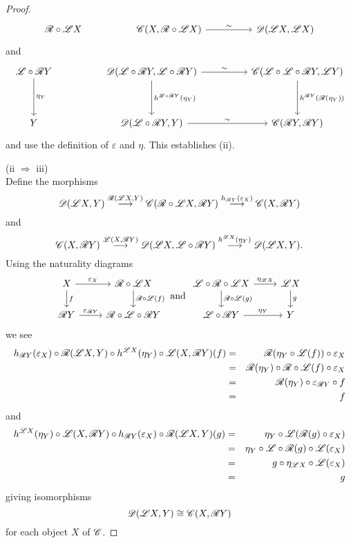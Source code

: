 \documentclass[10pt]{amsart}
\begin{document}
\begin{prop}
\begin{proof}
$$\begin{tikzcd}
      \RA \circ \LA X & & \C(X, \RA \circ \LA X) \arrow{rr}{\sim} & & \D(\LA X, \LA X)
    \end{tikzcd}$$
    and
    $$\begin{tikzcd}
      \LA \circ \RA Y \arrow{dd}{\eta_Y} & & \D(\LA \circ \RA Y, \LA \circ \RA Y) \arrow{rr}{\sim}\arrow{dd}{h^{\LA \circ \RA Y}(\eta_Y)} & & \C(\LA \circ \LA \circ \RA Y, \LA Y) \arrow{dd}{h^{\RA Y}(\RA(\eta_Y))}\\
      \\
      Y & & \D(\LA \circ \RA Y, Y) \arrow{rr}{\sim}  & & \C(\RA Y, \RA Y)
    \end{tikzcd}$$
    and use the definition of $\varepsilon$ and $\eta$.
    This establishes (ii).
    
    (ii $\Rightarrow$ iii)\\
    Define the morphisms
    $$\mathscr{D}(\mathscr{L} X, Y) \overset{\mathscr{R}(\mathscr{L} X, Y)}\longrightarrow \mathscr{C}(\mathscr{R} \circ \mathscr{L} X, \mathscr{R} Y) \overset{h_{\mathscr{R} Y}(\varepsilon_X)}\longrightarrow \mathscr{C}(X, \mathscr{R} Y)$$
    and
    $$\mathscr{C}(X, \mathscr{R} Y) \overset{\mathscr{L}(X, \mathscr{R} Y)}\longrightarrow \mathscr{D}(\mathscr{L} X, \mathscr{L} \circ \mathscr{R} Y) \overset{h^{\mathscr{L} X}(\eta_Y)}\longrightarrow \mathscr{D}(\mathscr{L} X, Y).$$
    Using the naturality diagrams
    $$\begin{tikzcd}
      X \arrow{r}{\varepsilon_X}\arrow{d}{f} & \RA \circ \LA X \arrow{d}{\RA \circ \LA(f)}\\
      \RA Y \arrow{r}{\varepsilon_{\RA Y}} & \RA \circ \LA \circ \RA Y
    \end{tikzcd}
    \ \text{and}\ 
    \begin{tikzcd}
      \LA \circ \RA \circ \LA X \arrow{r}{\eta_{\LA X}}\arrow{d}{\RA \circ \LA(g)} & \LA X \arrow{d}{g}\\
      \LA \circ \RA Y \arrow{r}{\eta_Y} & Y
    \end{tikzcd}$$
    we see
    \begin{eqnarray*}
      h_{\mathscr{R} Y}(\varepsilon_X) \circ \mathscr{R}(\mathscr{L} X, Y) \circ h^{\mathscr{L} X}(\eta_Y) \circ \mathscr{L}(X, \mathscr{R} Y)(f) &=& \mathscr{R}(\eta_Y \circ \mathscr{L}(f)) \circ \varepsilon_X\\
      &=& \mathscr{R}(\eta_Y) \circ \mathscr{R} \circ \mathscr{L}(f) \circ \varepsilon_X\\
      &=& \mathscr{R}(\eta_Y) \circ \varepsilon_{\mathscr{R} Y} \circ f\\
      &=& f
    \end{eqnarray*}
    and
    \begin{eqnarray*}
      h^{\mathscr{L} X}(\eta_Y) \circ \mathscr{L}(X, \mathscr{R} Y) \circ h_{\mathscr{R} Y}(\varepsilon_X) \circ \mathscr{R}(\mathscr{L} X, Y)(g) &=& \eta_Y \circ \mathscr{L}(\mathscr{R}(g) \circ \varepsilon_X)\\
      &=& \eta_Y \circ \mathscr{L} \circ \mathscr{R}(g) \circ \mathscr{L}(\varepsilon_X)\\
      &=& g \circ \eta_{\mathscr{L} X} \circ \mathscr{L}(\varepsilon_X)\\
      &=& g
    \end{eqnarray*}
    giving isomorphisms
    $$\mathscr{D}(\mathscr{L} X, Y) \cong \mathscr{C}(X, \mathscr{R} Y)$$
    for each object $X$ of $\mathscr{C}$.
    

\end{proof}
\end{prop}
\end{document}
